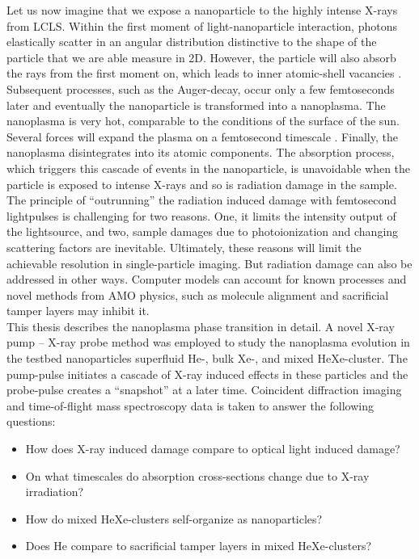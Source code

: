 %
Let us now imagine that we expose a nanoparticle to the highly intense X-rays from LCLS. Within the first moment of light-nanoparticle interaction, photons elastically scatter in an angular distribution distinctive to the shape of the particle that we are able measure in 2D. However, the particle will also absorb the rays from the first moment on, which leads to inner atomic-shell vacancies \citep{Young-2010-Nature}. Subsequent processes, such as the Auger-decay, occur only a few femtoseconds later and eventually the nanoparticle is transformed into a nanoplasma. The nanoplasma is very hot, comparable to the conditions of the surface of the sun. Several forces will expand the plasma on a femtosecond timescale \citep{Gorkhover-2016-NatPho}. Finally, the nanoplasma disintegrates into its atomic components. The absorption process, which triggers this cascade of events in the nanoparticle, is unavoidable when the particle is exposed to intense X-rays and so is radiation damage in the sample.\\[1\baselineskip]
%
The principle of ``outrunning'' the radiation induced damage with femtosecond lightpulses is challenging for two reasons. One, it limits the intensity output of the lightsource, and two, sample damages due to photoionization and changing scattering factors are inevitable. Ultimately, these reasons will limit the achievable resolution in single-particle imaging. But radiation damage can also be addressed in other ways. Computer models can account for known processes \citep{Quiney-2010-NatPhys} and novel methods from AMO physics, such as molecule alignment \citep{Kupper-2014-PRL} and sacrificial tamper layers \citep{Hau-Riege-2004-PRE,Hau-Riege-2010-PRL} may inhibit it.\\[1\baselineskip]
%
This thesis describes the nanoplasma phase transition in detail. A novel X-ray pump -- X-ray probe method was employed to study the nanoplasma evolution in the testbed nanoparticles superfluid He-, bulk Xe-, and mixed HeXe-cluster. The pump-pulse initiates a cascade of X-ray induced effects in these particles and the probe-pulse creates a ``snapshot'' at a later time. Coincident diffraction imaging and time-of-flight mass spectroscopy data is taken to answer the following questions:
\begin{itemize}
	\item How does X-ray induced damage compare to optical light induced damage?
	\item On what timescales do absorption cross-sections change due to X-ray irradiation?
	\item How do mixed HeXe-clusters self-organize as nanoparticles?
	\item Does He compare to sacrificial tamper layers in mixed HeXe-clusters?
\end{itemize}
